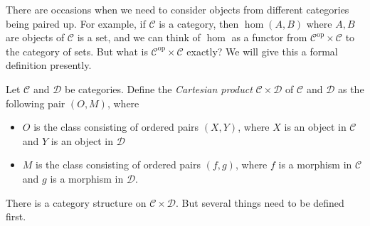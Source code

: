 \documentclass[12pt]{article}
\begin{document}
There are occasions when we need to consider objects from different categories being paired up.  For example, if $\mathcal{C}$ is a category, then $\hom(A,B)$ where $A,B$ are objects of $\mathcal{C}$ is a set, and we can think of $\hom$ as a functor from $\mathcal{C}^{\operatorname{op}}\times \mathcal{C}$ to the category of sets.  But what is $\mathcal{C}^{\operatorname{op}}\times \mathcal{C}$ exactly?  We will give this a formal definition presently.

Let $\mathcal{C}$ and $\mathcal{D}$ be categories.  Define the \emph{Cartesian product} $\mathcal{C}\times \mathcal{D}$ of $\mathcal{C}$ and $\mathcal{D}$ as the following pair $(O,M)$, where
\begin{itemize}
\item $O$ is the class consisting of ordered pairs $(X,Y)$, where $X$ is an object in $\mathcal{C}$ and $Y$ is an object in $\mathcal{D}$
\item $M$ is the class consisting of ordered pairs $(f,g)$, where $f$ is a morphism in $\mathcal{C}$ and $g$ is a morphism in $\mathcal{D}$.
\end{itemize}
There is a category structure on $\mathcal{C}\times \mathcal{D}$.  But several things need to be defined first.
\end{document}
